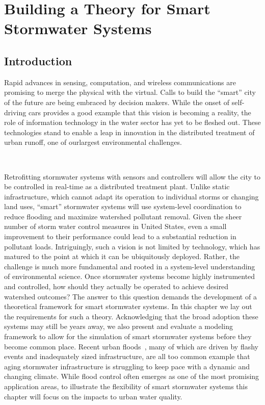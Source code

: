 \chapter{Building a Theory for Smart Stormwater Systems}\label{ch:theory}
\vspace{1cm}

\section{Introduction}

Rapid advances in sensing, computation, and wireless communications are promising to merge the physical with the virtual.
Calls to build the ``smart'' city of the future are being embraced by decision makers.
While the onset of self-driving cars provides a good example that this vision is becoming a reality, the role  of information technology in the water sector has yet to be fleshed out.
These technologies stand to enable a leap in innovation in the distributed treatment of urban runoff, one of ourlargest environmental challenges. 

\

Retrofitting stormwater systems with sensors and controllers will allow the city to be controlled in real-time as a distributed treatment plant.
Unlike static infrastructure, which cannot adapt its operation to individual storms or changing land uses, ``smart'' stormwater systems will use system-level coordination to reduce flooding and maximize watershed pollutant removal. Given the sheer number of storm water control measures in United States, even a small improvement to their performance could lead to a substantial reduction in pollutant loads.
Intriguingly, such a vision is not limited by technology, which has matured to the point at which it can be ubiquitously deployed. 
Rather, the challenge is much more fundamental and rooted in a system-level understanding of environmental science.
Once stormwater systems become highly instrumented and controlled, how should they actually be operated to achieve desired watershed outcomes?
The answer to this question demands the development of a theoretical framework for smart stormwater systems. 
In this chapter we lay out the requirements for such a theory.
Acknowledging that the broad adoption these systems may still be years away,  we also present and evaluate a modeling framework to allow for the simulation of smart stormwater systems before they become common place. 
Recent urban floods~\cite{Frosch2016}, many of which are driven by flashy events and inadequately sized infrastructure, are all too common example that aging stormwater infrastructure is struggling to keep pace with a dynamic and changing climate. 
While flood control often emerges as one of the most promising application areas, to illustrate the flexibility of smart stormwater systems this chapter will focus on the impacts to urban water quality.


